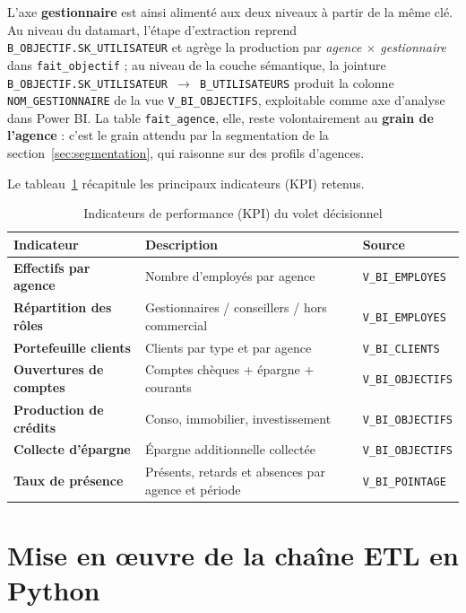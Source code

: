 L'axe \textbf{gestionnaire} est ainsi alimenté aux deux niveaux à partir de la
même clé. Au niveau du datamart, l'étape d'extraction reprend
\texttt{B\_OBJECTIF.SK\_UTILISATEUR} et agrège la production par
\emph{agence $\times$ gestionnaire} dans \texttt{fait\_objectif} ; au niveau de la
couche sémantique, la jointure \texttt{B\_OBJECTIF.SK\_UTILISATEUR $\rightarrow$
B\_UTILISATEURS} produit la colonne \texttt{NOM\_GESTIONNAIRE} de la vue
\texttt{V\_BI\_OBJECTIFS}, exploitable comme axe d'analyse dans Power BI. La table
\texttt{fait\_agence}, elle, reste volontairement au \textbf{grain de l'agence} :
c'est le grain attendu par la segmentation de la
section~\ref{sec:segmentation}, qui raisonne sur des profils d'agences.

Le tableau~\ref{tab:kpi} récapitule les principaux indicateurs (KPI) retenus.

\begin{table}[htbp]
\centering
\caption{Indicateurs de performance (KPI) du volet décisionnel}
\label{tab:kpi}
\renewcommand{\arraystretch}{1.25}
\begin{tabularx}{\textwidth}{|>{\bfseries}p{4.2cm}|X|p{2.6cm}|}
\hline
\textmd{\textbf{Indicateur}} & \textbf{Description} & \textbf{Source}\\
\hline
Effectifs par agence & Nombre d'employés par agence & \texttt{V\_BI\_EMPLOYES}\\
\hline
Répartition des rôles & Gestionnaires / conseillers / hors commercial & \texttt{V\_BI\_EMPLOYES}\\
\hline
Portefeuille clients & Clients par type et par agence & \texttt{V\_BI\_CLIENTS}\\
\hline
Ouvertures de comptes & Comptes chèques + épargne + courants & \texttt{V\_BI\_OBJECTIFS}\\
\hline
Production de crédits & Conso, immobilier, investissement & \texttt{V\_BI\_OBJECTIFS}\\
\hline
Collecte d'épargne & Épargne additionnelle collectée & \texttt{V\_BI\_OBJECTIFS}\\
\hline
Taux de présence & Présents, retards et absences par agence et période & \texttt{V\_BI\_POINTAGE}\\
\hline
\end{tabularx}
\end{table}

\section{Mise en œuvre de la chaîne ETL en Python}
\label{sec:etl}

